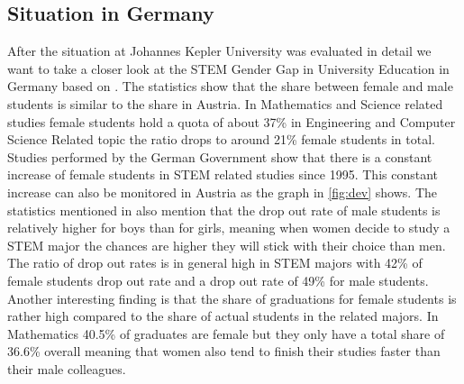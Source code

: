 \documentclass[12pt]{article}
\begin{document}
\subsection{Situation in Germany}
After the situation at Johannes Kepler University was evaluated in detail we want to take a closer look at the STEM Gender Gap in University Education in Germany based on \cite{schneider}. The statistics show that the share between female and male students is similar to the share in Austria. In Mathematics and Science related studies female students hold a quota of about  37\% in Engineering and Computer Science Related topic the ratio drops to around 21\% female students in total. Studies performed by the German Government show that there is a constant increase of female students in STEM related studies since 1995. This constant increase can also be monitored in Austria as the graph in \ref{fig:dev} shows.\newline
The statistics mentioned in \cite{schneider} also mention that the drop out rate of male students is relatively higher for boys than for girls, meaning when women decide to study a STEM major the chances are higher they will stick with their choice than men. The ratio of drop out rates is in general high in STEM majors with 42\% of female students drop out rate and a drop out rate of 49\% for male students.\\

Another interesting finding is that the share of graduations for female students is rather high compared to the share of actual students in the related majors. In Mathematics 40.5\% of graduates are female but they only have a total share of 36.6\%  overall meaning that women also tend to finish their studies faster than their male colleagues.
\end{document}
